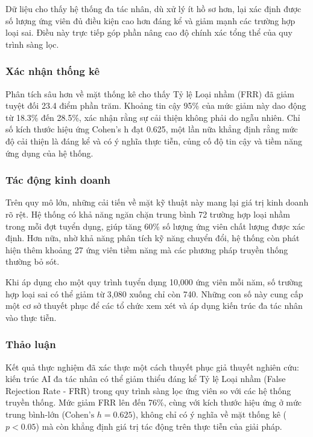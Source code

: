 \documentclass{article}
\begin{document}
\begin{itemize}[topsep=0pt, itemsep=4pt, leftmargin=40pt]
Dữ liệu cho thấy hệ thống đa tác nhân, dù xử lý ít hồ sơ hơn, lại xác định được số lượng ứng viên đủ điều kiện cao hơn đáng kể và giảm mạnh các trường hợp loại sai. Điều này trực tiếp góp phần nâng cao độ chính xác tổng thể của quy trình sàng lọc.

\subsubsection{Xác nhận thống kê}

Phân tích sâu hơn về mặt thống kê cho thấy Tỷ lệ Loại nhầm (FRR) đã giảm tuyệt đối 23.4 điểm phần trăm. Khoảng tin cậy 95\% của mức giảm này dao động từ 18.3\% đến 28.5\%, xác nhận rằng sự cải thiện không phải do ngẫu nhiên. Chỉ số kích thước hiệu ứng Cohen's h đạt 0.625, một lần nữa khẳng định rằng mức độ cải thiện là đáng kể và có ý nghĩa thực tiễn, củng cố độ tin cậy và tiềm năng ứng dụng của hệ thống.

\subsubsection{Tác động kinh doanh}
Trên quy mô lớn, những cải tiến về mặt kỹ thuật này mang lại giá trị kinh doanh rõ rệt. Hệ thống có khả năng ngăn chặn trung bình 72 trường hợp loại nhầm trong mỗi đợt tuyển dụng, giúp tăng 60\% số lượng ứng viên chất lượng được xác định. Hơn nữa, nhờ khả năng phân tích kỹ năng chuyển đổi, hệ thống còn phát hiện thêm khoảng 27 ứng viên tiềm năng mà các phương pháp truyền thống thường bỏ sót.

Khi áp dụng cho một quy trình tuyển dụng 10,000 ứng viên mỗi năm, số trường hợp loại sai có thể giảm từ 3,080 xuống chỉ còn 740. Những con số này cung cấp một cơ sở thuyết phục để các tổ chức xem xét và áp dụng kiến trúc đa tác nhân vào thực tiễn.

\subsubsection{Thảo luận}
Kết quả thực nghiệm đã xác thực một cách thuyết phục giả thuyết nghiên cứu: kiến trúc AI đa tác nhân có thể giảm thiểu đáng kể Tỷ lệ Loại nhầm (False Rejection Rate - FRR) trong quy trình sàng lọc ứng viên so với các hệ thống truyền thống. Mức giảm FRR lên đến 76\%, cùng với kích thước hiệu ứng ở mức trung bình-lớn ($\text{Cohen's } h=0.625$), không chỉ có ý nghĩa về mặt thống kê ($p<0.05$) mà còn khẳng định giá trị tác động trên thực tiễn của giải pháp.


\end{itemize}
\end{document}
